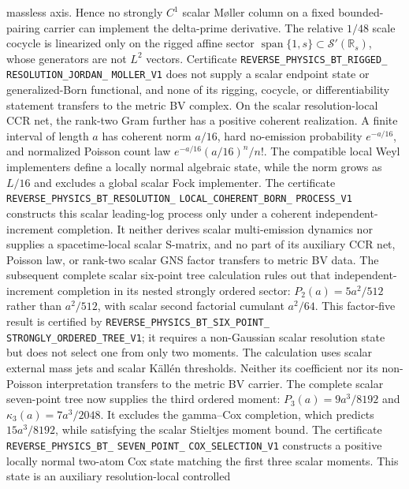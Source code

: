 \documentclass[11pt]{article}
\theoremstyle{definition}
\theoremstyle{remark}
\begin{document}
massless axis.  Hence no strongly $C^1$ scalar M\o ller column on a fixed
bounded-pairing carrier can implement the delta-prime derivative.  The
relative $1/48$ scale cocycle is linearized only on the rigged affine sector
$\operatorname{span}\{1,s\}\subset\mathcal S'(\mathbb R_s)$, whose
generators are not $L^2$ vectors.  Certificate
\texttt{REVERSE\_PHYSICS\_BT\_RIGGED\_}
\allowbreak\texttt{RESOLUTION\_JORDAN\_}
\allowbreak\texttt{MOLLER\_V1}
does not supply a scalar endpoint state or generalized-Born functional, and
none of its rigging, cocycle, or differentiability statement transfers to the
metric BV complex.
On the scalar resolution-local CCR net, the rank-two Gram further has a
positive coherent realization.  A finite interval of length $a$ has coherent
norm $a/16$, hard no-emission probability $e^{-a/16}$, and normalized Poisson
count law $e^{-a/16}(a/16)^n/n!$.  The compatible local Weyl implementers
define a locally normal algebraic state, while the norm grows as $L/16$ and
excludes a global scalar Fock implementer.  The certificate
\texttt{REVERSE\_PHYSICS\_BT\_RESOLUTION\_}
\allowbreak\texttt{LOCAL\_COHERENT\_BORN\_}
\allowbreak\texttt{PROCESS\_V1}
constructs this scalar leading-log process only under a coherent independent-
increment completion.  It neither derives scalar multi-emission dynamics nor
supplies a spacetime-local scalar S-matrix, and no part of its auxiliary CCR
net, Poisson law, or rank-two scalar GNS factor transfers to metric BV data.
The subsequent complete scalar six-point tree calculation rules out that
independent-increment completion in its nested strongly ordered sector:
$P_2(a)=5a^2/512$ rather than $a^2/512$, with scalar second factorial
cumulant $a^2/64$.  This factor-five result is certified by
\texttt{REVERSE\_PHYSICS\_BT\_SIX\_POINT\_}
\allowbreak\texttt{STRONGLY\_ORDERED\_TREE\_V1}; it requires a non-Gaussian
scalar resolution state but does not select one from only two moments.  The
calculation uses scalar external mass jets and scalar K\"all\'en thresholds.
Neither its coefficient nor its non-Poisson interpretation transfers to the
metric BV carrier.
The complete scalar seven-point tree now supplies the third ordered moment:
$P_3(a)=9a^3/8192$ and $\kappa_3(a)=7a^3/2048$.  It excludes the gamma--Cox
completion, which predicts $15a^3/8192$, while satisfying the scalar
Stieltjes moment bound.  The certificate
\texttt{REVERSE\_PHYSICS\_BT\_}
\allowbreak\texttt{SEVEN\_POINT\_}
\allowbreak\texttt{COX\_SELECTION\_V1}
constructs a positive locally normal two-atom Cox state matching the first
three scalar moments.  This state is an auxiliary resolution-local controlled
\end{document}
